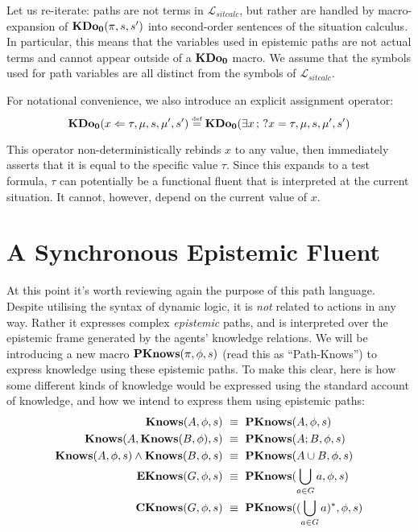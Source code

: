 Let us re-iterate: paths are not terms in $\mathcal{L}_{sitcalc}$,
but rather are handled by macro-expansion of $\mathbf{KDo_{0}}(\pi,s,s')$ into
second-order sentences of the situation calculus. In particular, this
means that the variables used in epistemic paths are not actual terms
and cannot appear outside of a $\mathbf{KDo_{0}}$ macro. We assume that the
symbols used for path variables are all distinct from the symbols
of $\mathcal{L}_{sitcalc}$.

For notational convenience, we also introduce an explicit assignment
operator:\[
\mathbf{KDo_{0}}(x\Leftarrow\tau,\mu,s,\mu',s')\stackrel{\mbox{\tiny def}}{=}\mathbf{KDo_{0}}(\exists x\,;\,?x=\tau,\mu,s,\mu',s')\]


This operator non-deterministically rebinds $x$ to any value, then
immediately asserts that it is equal to the specific value $\tau$.
Since this expands to a test formula, $\tau$ can potentially be a
functional fluent that is interpreted at the current situation. It
cannot, however, depend on the current value of $x$.


\section{A Synchronous Epistemic Fluent\label{sec:CKnowledge:Synchronous}}

At this point it's worth reviewing again the purpose of this path
language. Despite utilising the syntax of dynamic logic, it is \emph{not}
related to actions in any way. Rather it expresses complex \emph{epistemic}
paths, and is interpreted over the epistemic frame generated by the
agents' knowledge relations. We will be introducing a new macro $\mathbf{PKnows}(\pi,\phi,s)$
(read this as {}``Path-Knows'') to express knowledge using these
epistemic paths. To make this clear, here is how some different kinds
of knowledge would be expressed using the standard account of knowledge,
and how we intend to express them using epistemic paths:\begin{align}
\mathbf{Knows}(A,\phi,s) & \,\,\equiv\,\,\mathbf{PKnows}(A,\phi,s)\nonumber \\
\mathbf{Knows}(A,\mathbf{Knows}(B,\phi),s) & \,\,\equiv\,\,\mathbf{PKnows}(A;B,\phi,s)\nonumber \\
\mathbf{Knows}(A,\phi,s)\wedge\mathbf{Knows}(B,\phi,s) & \,\,\equiv\,\,\mathbf{PKnows}(A\cup B,\phi,s)\nonumber \\
\mathbf{EKnows}(G,\phi,s) & \,\,\equiv\,\,\mathbf{PKnows}(\bigcup_{a\in G}a,\phi,s)\nonumber \\
\mathbf{CKnows}(G,\phi,s) & \,\,\equiv\,\,\mathbf{PKnows}((\bigcup_{a\in G}a)^{*},\phi,s)\label{eq:pknows_identities}\end{align}


